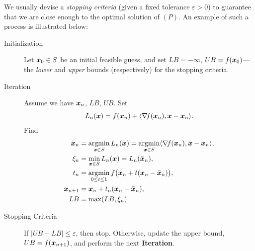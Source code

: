 We usually devise a \emph{stopping criteria} (given a fixed tolerance $\varepsilon>0$) to guarantee that we are close enough to the optimal solution of $(P)$.  An example of such a process is illustrated below:
\begin{description}
\item [Initialization] Let $\boldsymbol{x}_0 \in S$ be an initial feasible guess, and set $LB=-\infty$, $UB=f(\boldsymbol{x}_0)$---the \emph{lower} and \emph{upper} bounds (respectively) for the stopping criteria.
\item [Iteration] Assume we have $\boldsymbol{x}_n$, $LB$, $UB$.  Set 
\begin{equation*}
L_n(\boldsymbol{x}) = f(\boldsymbol{x}_n) + \langle \mathop{\nabla\! {f}}(\boldsymbol{x}_n), \boldsymbol{x}-\boldsymbol{x}_n \rangle. 
\end{equation*}
Find
\begin{align*}
\bar{\boldsymbol{x}}_n &= \operatorname*{argmin}_{\boldsymbol{x} \in S} L_n(\boldsymbol{x}) = \operatorname*{argmin}_{\boldsymbol{x} \in S} \langle \mathop{\nabla\! {f}}(\boldsymbol{x}_n), \boldsymbol{x}-\boldsymbol{x}_n \rangle,\\
\xi_n &= \min_{\boldsymbol{x} \in S} L_n(\boldsymbol{x}) = L_n(\bar{\boldsymbol{x}}_n),\\
t_n &= \operatorname*{argmin}_{0 \leq t \leq 1} f\big(\boldsymbol{x}_n + t(\boldsymbol{x}_n - \bar{\boldsymbol{x}}_n)\big), \\
\boldsymbol{x}_{n+1} &= \boldsymbol{x}_n + t_n (\boldsymbol{x}_n - \bar{\boldsymbol{x}}_n), \\
LB &= \max(LB, \xi_n)
\end{align*}
\item [Stopping Criteria] If $\lvert UB-LB \rvert \leq \varepsilon$, then stop. Otherwise, update the upper bound, $UB = f(\boldsymbol{x}_{n+1})$, and perform the next \textbf{Iteration}.
\end{description}

